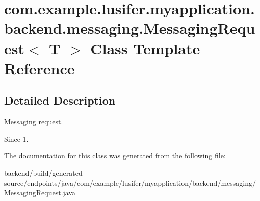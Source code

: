 \hypertarget{classcom_1_1example_1_1lusifer_1_1myapplication_1_1backend_1_1messaging_1_1_messaging_request}{}\section{com.\+example.\+lusifer.\+myapplication.\+backend.\+messaging.\+Messaging\+Request$<$ T $>$ Class Template Reference}
\label{classcom_1_1example_1_1lusifer_1_1myapplication_1_1backend_1_1messaging_1_1_messaging_request}


\subsection{Detailed Description}
\hyperlink{classcom_1_1example_1_1lusifer_1_1myapplication_1_1backend_1_1messaging_1_1_messaging}{Messaging} request.

\begin{DoxySince}{Since}
1. 
\end{DoxySince}


The documentation for this class was generated from the following file\+:\begin{DoxyCompactItemize}
\item 
backend/build/generated-\/source/endpoints/java/com/example/lusifer/myapplication/backend/messaging/Messaging\+Request.\+java\end{DoxyCompactItemize}
